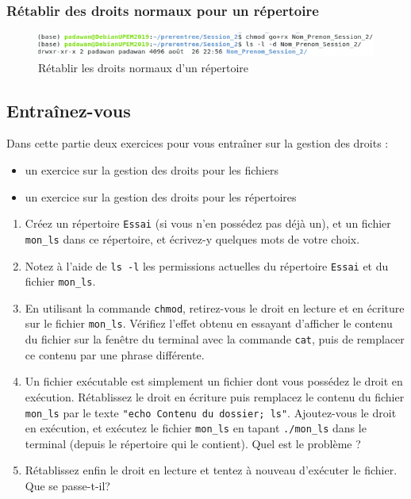 \documentclass{article}
\begin{document}
\subsubsection{Rétablir des droits normaux pour un répertoire} 

\begin{figure}[h!]
    \begin{center}
    \includegraphics[scale=0.6]{rep_Retablir_Droit.png}
    \caption{Rétablir les droits normaux d'un répertoire}
     \end{center}
\end{figure}   

\hypertarget{Entraînez-vous}{
\subsection{Entraînez-vous}\label{Entraînez-vous}}

Dans cette partie deux exercices pour vous entraîner sur la gestion des droits :

\begin{itemize}
\item
un exercice sur la gestion des droits pour les fichiers
\item
un exercice sur la gestion des droits pour les répertoires
\end{itemize}

\begin{exercice}

\begin{enumerate}
\def\labelenumi{\arabic{enumi}.}
\item
  Créez un répertoire \texttt{Essai} (si vous n'en possédez pas déjà
  un), et un fichier \texttt{mon\_ls} dans ce répertoire, et écrivez-y
  quelques mots de votre choix.
\item
  Notez à l'aide de \texttt{ls\ -l} les permissions actuelles du
  répertoire \texttt{Essai} et du fichier \texttt{mon\_ls}.
\item
  En utilisant la commande \texttt{chmod}, retirez-vous le droit en
  lecture et en écriture sur le fichier \texttt{mon\_ls}. Vérifiez
  l'effet obtenu en essayant d'afficher le contenu du fichier sur la
  fenêtre du terminal avec la commande \texttt{cat}, puis de remplacer
  ce contenu par une phrase différente.
\item
  Un fichier exécutable est simplement un fichier dont vous possédez le
  droit en exécution. Rétablissez le droit en écriture puis remplacez le
  contenu du fichier \texttt{mon\_ls} par le texte
  \texttt{"echo\ Contenu\ du\ dossier;\ ls"}. Ajoutez-vous le droit en
  exécution, et exécutez le fichier \texttt{mon\_ls} en tapant
  \texttt{./mon\_ls} dans le terminal (depuis le répertoire qui le
  contient). Quel est le problème ?
\item
  Rétablissez enfin le droit en lecture et tentez à nouveau d'exécuter
  le fichier. Que se passe-t-il?
\end{enumerate}

\end{exercice}
\end{document}
